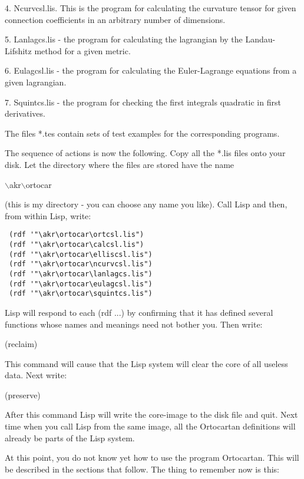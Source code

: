 4. Ncurvcsl.lis. This is the program for calculating the curvature tensor for
given connection coefficients in an arbitrary number of dimensions.

5. Lanlagcs.lis - the program for calculating the lagrangian by the
Landau-Lifshitz method for a given metric.

6. Eulagcsl.lis - the program for calculating the Euler-Lagrange equations from
a given lagrangian.

7. Squintcs.lis - the program for checking the first integrals quadratic in
first derivatives.

The files *.tes contain sets of test examples for the corresponding programs.

The sequence of actions is now the following. Copy all the *.lis files onto
your disk. Let the directory where the files are stored have the name

$\backslash$akr$\backslash$ortocar

\noindent (this is my directory - you can choose any name you like). Call Lisp
and then, from within Lisp, write:

\bigskip

\begin{verbatim}
 (rdf '"\akr\ortocar\ortcsl.lis")
 (rdf '"\akr\ortocar\calcsl.lis")
 (rdf '"\akr\ortocar\elliscsl.lis")
 (rdf '"\akr\ortocar\ncurvcsl.lis")
 (rdf '"\akr\ortocar\lanlagcs.lis")
 (rdf '"\akr\ortocar\eulagcsl.lis")
 (rdf '"\akr\ortocar\squintcs.lis")
\end{verbatim}

\bigskip

\noindent Lisp will respond to each (rdf ...) by confirming that it has defined
several functions whose names and meanings need not bother you. Then write:

\bigskip

(reclaim)

\bigskip

\noindent This command will cause that the Lisp system will clear the core
of all useless data. Next write:

\bigskip

(preserve)

\bigskip

\noindent After this command Lisp will write the core-image to the disk file
and quit. Next time when you call Lisp from the same image, all the Ortocartan
definitions will already be parts of the Lisp system.

At this point, you do not know yet how to use the program Ortocartan. This will
be described in the sections that follow. The thing to remember now is this:

